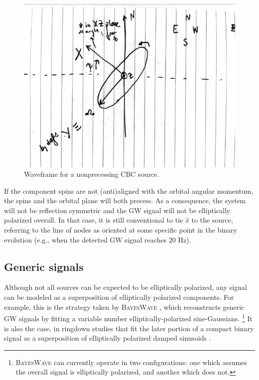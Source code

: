 \documentclass[aps,prd,twocolumn,superscriptaddress,preprintnumbers,floatfix,nofootinbib]{revtex4-2}
\begin{document}
\begin{figure}
\includegraphics[width=\columnwidth]{waveframe}
\caption{Waveframe for a nonprecessing CBC source.}
\label{fig:waveframe}
\end{figure}


If the component spins are not (anti)aligned with the orbital angular momentum, the spins and the orbital plane will both precess.
As a consequence, the system will not be reflection symmetric and the GW signal will not be elliptically polarized overall.
In that case, it is still conventional to tie $\hat{x}$ to the source, referring to the line of nodes as oriented at some specific point in the binary evolution (e.g., when the detected GW signal reaches 20 Hz).

\subsection{Generic signals}

Although not all sources can be expected to be elliptically polarized, any signal can be modeled as a superposition of elliptically polarized components.
For example, this is the strategy taken by \textsc{BayesWave} \cite{Cornish:2014kda,Cornish:2020dwh}, which reconstructs generic GW signals by fitting a variable number elliptically-polarized sine-Gaussians.%
\footnote{\textsc{BayesWave} can currently operate in two configurations: one which assumes the overall signal is elliptically polarized, and another which does not.}
It is also the case, in ringdown studies that fit the later portion of a compact binary signal as a superposition of elliptically polarized damped sinusoids \cite{Isi:2021iql}.
\end{document}
